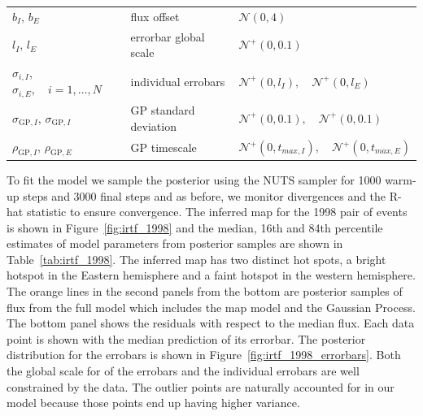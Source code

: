 \documentclass[modern]{aastex62}
\begin{document}
\begin{table}[t!]
\begin{center}
\begin{longtable}{W{l}{4cm} W{l}{4cm} W{l}{6cm}}
            \\
    $b_I$, $b_E$& flux offset &$\mathcal{N}(0, 4)$
            \\
            $l_I$, $l_E$& errorbar global scale&$\mathcal{N}^+(0,0.1)$
            \\
            $\sigma_{i,I}$, $\sigma_{i,E},\quad i=1,\dots,N$& individual errobars&
            $\mathcal{N}^+(0,l_I),\quad \mathcal{N}^+(0,l_E)$
            \\
            $\sigma_{\mathrm{GP}, I}$, $\sigma_{\mathrm{GP}, I}$ & GP standard deviation&$\mathcal{N}^+(0,0.1),\quad \mathcal{N}^+(0,0.1)$
            \\
            $\rho_{\mathrm{GP},I}$, $\rho_{\mathrm{GP},E}$ & GP timescale  & $\mathcal{N}^+(0, t_{max, I}),\quad  \mathcal{N}^+(0, t_{max, E})$
        \\
        \end{longtable}
    \end{center}
\end{table}

To fit the model we sample the posterior using the NUTS sampler for 1000 warm-up steps and 3000 final steps and as before, we monitor divergences and the R-hat statistic to ensure convergence.
The inferred map for the 1998 pair of events is shown in Figure~\ref{fig:irtf_1998} and the median, 16th and 84th percentile estimates of model parameters from posterior samples are shown in Table~\ref{tab:irtf_1998}. 
The inferred map has two distinct hot spots, a bright hotspot in the Eastern hemisphere and a faint hotspot in the western hemisphere.
The orange lines in the second panels from the bottom are posterior samples of flux from the full model which includes the map model and the Gaussian Process.
The bottom panel shows the residuals with respect to the median flux.
Each data point is shown with the median prediction of its errorbar.
The posterior distribution for the errobars is shown in Figure~\ref{fig:irtf_1998_errorbars}.
Both the global scale for of the errobars and the individual errobars are well constrained by the data. 
The outlier points are naturally accounted for in our model because those points end up having higher variance.
\end{document}

